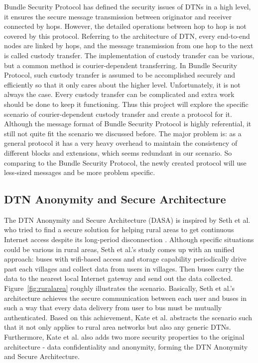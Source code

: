 Bundle Security Protocol has defined the security issues of DTNs in a high level, it ensures the secure message transmission between originator and receiver connected by hops. However, the detailed operations between hop to hop is not covered by this protocol. Referring to the architecture of DTN, every end-to-end nodes are linked by hops, and the message transmission from one hop to the next is called custody transfer. The implementation of custody transfer can be various, but a common method is courier-dependent transferring. In Bundle Security Protocol, such custody transfer is assumed to be accomplished securely and efficiently so that it only cares about the higher level. Unfortunately, it is not always the case. Every custody transfer can be complicated and extra work should be done to keep it functioning. Thus this project will explore the specific scenario of courier-dependent custody transfer and create a protocol for it. Although the message format of Bundle Security Protocol is highly referential, it still not quite fit the scenario we discussed before. The major problem is: as a general protocol it has a very heavy overhead to maintain the consistency of different blocks and extensions, which seems redundant in our scenario. So comparing to the Bundle Security Protocol, the newly created protocol will use less-sized messages and be more problem specific.

\subsection{DTN Anonymity and Secure Architecture \cite{Kate}}
The DTN Anonymity and Secure Architecture (DASA) is inspired by Seth et al. who tried to find a secure solution for helping rural areas to get continuous Internet access despite its long-period disconnection \cite{Seth}\cite{SethKeshav}. Although specific situations could be various in rural areas, Seth et al.'s study comes up with an unified approach: buses with wifi-based access and storage capability periodically drive past each villages and collect data from users in villages. Then buses carry the data to the nearest local Internet gateway and send out the data collected. Figure~\ref{fig:ruralarea} roughly illustrates the scenario. Basically, Seth et al.'s architecture achieves the secure communication between each user and buses in such a way that every data delivery from user to bus must be mutually authenticated. Based on this achievement, Kate et al. abstracts the scenario such that it not only applies to rural area networks but also any generic DTNs. Furthermore, Kate et al. also adds two more security properties to the original architecture - data confidentiality and anonymity, forming the DTN Anonymity and Secure Architecture.

